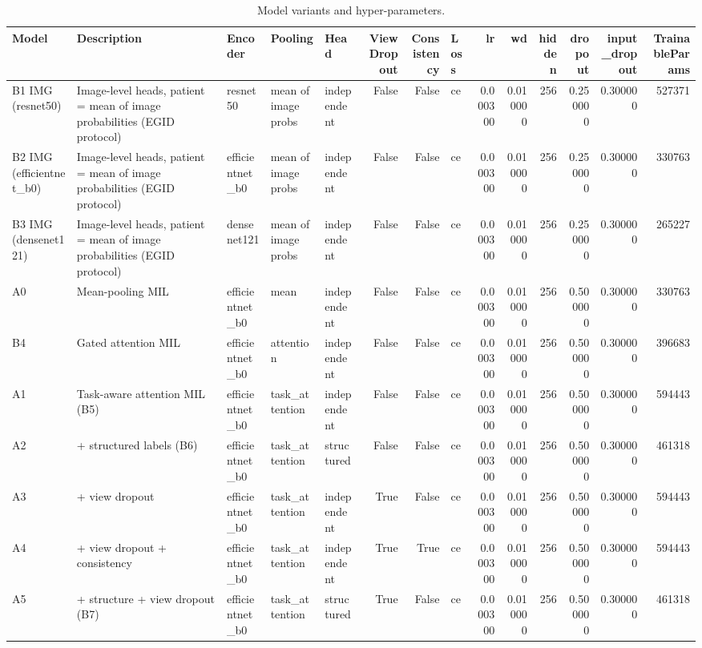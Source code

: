 \begin{table}
\caption{Model variants and hyper-parameters.}
\label{tab:table2_models}
\begin{tabular}{lllllrrlrrrrrr}
\toprule
Model & Description & Encoder & Pooling & Head & ViewDropout & Consistency & Loss & lr & wd & hidden & dropout & input\_dropout & TrainableParams \\
\midrule
B1 IMG (resnet50) & Image-level heads, patient = mean of image probabilities (EGID protocol) & resnet50 & mean of image probs & independent & False & False & ce & 0.000300 & 0.010000 & 256 & 0.250000 & 0.300000 & 527371 \\
B2 IMG (efficientnet\_b0) & Image-level heads, patient = mean of image probabilities (EGID protocol) & efficientnet\_b0 & mean of image probs & independent & False & False & ce & 0.000300 & 0.010000 & 256 & 0.250000 & 0.300000 & 330763 \\
B3 IMG (densenet121) & Image-level heads, patient = mean of image probabilities (EGID protocol) & densenet121 & mean of image probs & independent & False & False & ce & 0.000300 & 0.010000 & 256 & 0.250000 & 0.300000 & 265227 \\
A0 & Mean-pooling MIL & efficientnet\_b0 & mean & independent & False & False & ce & 0.000300 & 0.010000 & 256 & 0.500000 & 0.300000 & 330763 \\
B4 & Gated attention MIL & efficientnet\_b0 & attention & independent & False & False & ce & 0.000300 & 0.010000 & 256 & 0.500000 & 0.300000 & 396683 \\
A1 & Task-aware attention MIL (B5) & efficientnet\_b0 & task\_attention & independent & False & False & ce & 0.000300 & 0.010000 & 256 & 0.500000 & 0.300000 & 594443 \\
A2 & + structured labels (B6) & efficientnet\_b0 & task\_attention & structured & False & False & ce & 0.000300 & 0.010000 & 256 & 0.500000 & 0.300000 & 461318 \\
A3 & + view dropout & efficientnet\_b0 & task\_attention & independent & True & False & ce & 0.000300 & 0.010000 & 256 & 0.500000 & 0.300000 & 594443 \\
A4 & + view dropout + consistency & efficientnet\_b0 & task\_attention & independent & True & True & ce & 0.000300 & 0.010000 & 256 & 0.500000 & 0.300000 & 594443 \\
A5 & + structure + view dropout (B7) & efficientnet\_b0 & task\_attention & structured & True & False & ce & 0.000300 & 0.010000 & 256 & 0.500000 & 0.300000 & 461318 \\

\end{tabular}
\end{table}
